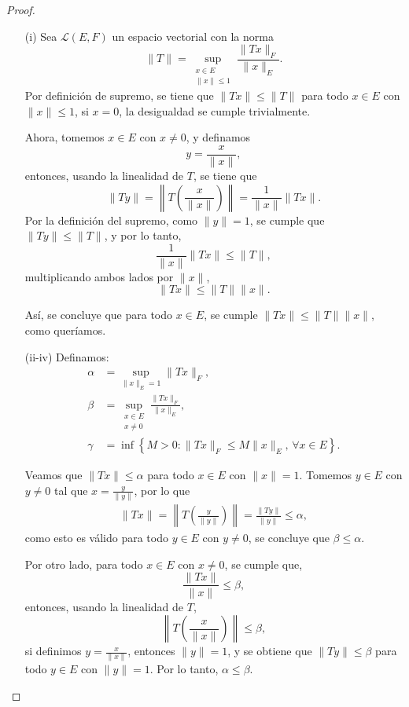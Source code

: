 \begin{proof}
\hfill
\begin{enumerate}
    \item[(i)]Sea \(\mathcal{L}(E, F)\) un espacio vectorial con la norma
\[
\|T\| = \sup_{\substack{x \in E \\ \| x\| \leq 1}} \frac{\|Tx\|_F}{\|x\|_E}.
\]
Por definición de supremo, se tiene que \(\|Tx\| \leq \|T\|\) para todo \(x \in E\) con \(\|x\| \leq 1\), si \(x = 0\), la desigualdad se cumple trivialmente. 

Ahora, tomemos \(x \in E\) con \(x \neq 0\), y definamos
\[
y = \frac{x}{\|x\|},
\]
entonces, usando la linealidad de \(T\), se tiene que
\[
\|Ty\| = \left\|T\left(\frac{x}{\|x\|}\right)\right\| = \frac{1}{\|x\|} \|Tx\|.
\]
Por la definición del supremo, como \(\|y\| = 1\), se cumple que \(\|Ty\| \leq \|T\|\), y por lo tanto,
\[
\frac{1}{\|x\|} \|Tx\| \leq \|T\|,
\]
multiplicando ambos lados por \(\|x\|\),
\[
\|Tx\| \leq \|T\|\|x\|.
\]

Así, se concluye que para todo \(x \in E\), se cumple \(\|Tx\| \leq \|T\|\|x\|\), como queríamos.

\item[(ii-iv)] Definamos:
\begin{align*}
    \alpha &= \sup_{\|x\|_E = 1} \|T x\|_F,\\
    \beta &= \sup_{\substack{x \in E \\ x \neq 0}} \frac{\|T x\|_F}{\|x\|_E},\\
    \gamma &= \inf \left\{ M > 0 : \|T x\|_F \leq M \|x\|_E, \, \forall x \in E \right\}.
\end{align*}

Veamos que \(\|Tx\| \leq \alpha\) para todo \(x \in E\) con \(\|x\| = 1\).  
Tomemos \(y \in E\) con \(y \neq 0\) tal que \(x = \frac{y}{\|y\|}\), por lo que
\begin{align*}
    \|Tx\| = \left\|T\left(\frac{y}{\|y\|}\right)\right\| = \frac{\|Ty\|}{\|y\|} \leq \alpha,
\end{align*}
como esto es válido para todo \(y \in E\) con \(y \neq 0\), se concluye que \(\beta \leq \alpha\).

Por otro lado, para todo \(x \in E\) con \(x \neq 0\), se cumple que,
\[
\frac{\|Tx\|}{\|x\|} \leq \beta,
\]
entonces, usando la linealidad de \(T\),
\[
\left\|T\left(\frac{x}{\|x\|}\right)\right\| \leq \beta,
\]
si definimos \(y = \frac{x}{\|x\|}\), entonces \(\|y\| = 1\), y se obtiene que \(\|Ty\| \leq \beta\) para todo \(y \in E\) con \(\|y\| = 1\). Por lo tanto, \(\alpha \leq \beta\).


\end{enumerate}
\end{proof}
